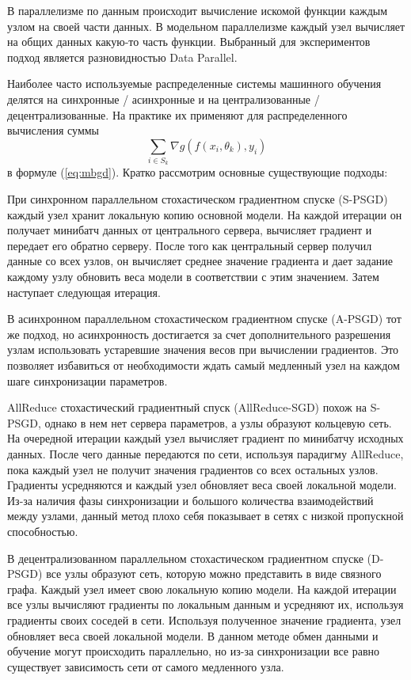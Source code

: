 \documentclass[a4paper,article,14pt]{extarticle}
\begin{document}
В параллелизме по данным происходит вычисление искомой функции каждым узлом на своей части данных. В модельном параллелизме каждый узел вычисляет на общих данных какую-то часть функции. Выбранный для экспериментов подход является разновидностью Data Parallel.

Наиболее часто используемые распределенные системы машинного обучения делятся на синхронные / асинхронные и на централизованные / децентрализованные. На практике их применяют для распределенного вычисления суммы
\begin{equation}
\sum_{i\in S_k}\nabla g(f(x_i, \theta_k), y_i)
\end{equation}
в формуле (\ref{eq:mbgd}). Кратко рассмотрим основные существующие подходы:

При синхронном параллельном стохастическом градиентном спуске (S-PSGD) \cite{o1} каждый узел хранит локальную копию основной модели. На каждой итерации он получает минибатч данных от центрального сервера, вычисляет градиент и передает его обратно серверу. После того как центральный сервер получил данные со всех узлов, он вычисляет среднее значение градиента и дает задание каждому узлу обновить веса модели в соответствии с этим значением. Затем наступает следующая итерация.

В асинхронном параллельном стохастическом градиентном спуске (A-PSGD) \cite{o2, o3, o4, o5} тот же подход, но асинхронность достигается за счет дополнительного разрешения узлам использовать устаревшие значения весов при вычислении градиентов. Это позволяет избавиться от необходимости ждать самый медленный узел на каждом шаге синхронизации параметров.

AllReduce стохастический градиентный спуск (AllReduce-SGD) \cite{o6, o7} похож на  S-PSGD,  однако в нем нет сервера параметров, а узлы образуют кольцевую сеть. На очередной итерации каждый узел вычисляет градиент по минибатчу исходных данных. После чего данные передаются по сети, используя парадигму AllReduce, пока каждый узел не получит значения градиентов со всех остальных узлов. Градиенты усредняются и каждый узел обновляет веса своей локальной модели. Из-за наличия фазы синхронизации и большого количества взаимодействий между узлами, данный метод плохо себя показывает в сетях с низкой пропускной способностью.

В децентрализованном параллельном стохастическом градиентном спуске (D-PSGD) \cite{o8, o9, o10} все узлы образуют сеть, которую можно представить в виде связного графа. Каждый узел имеет свою локальную копию модели. На каждой итерации все узлы вычисляют градиенты по локальным данным и усредняют их, используя градиенты своих соседей в сети. Используя полученное значение градиента, узел обновляет веса своей локальной модели. В данном методе обмен данными и обучение могут происходить параллельно, но из-за синхронизации все равно существует зависимость сети от самого медленного узла.
\end{document}
